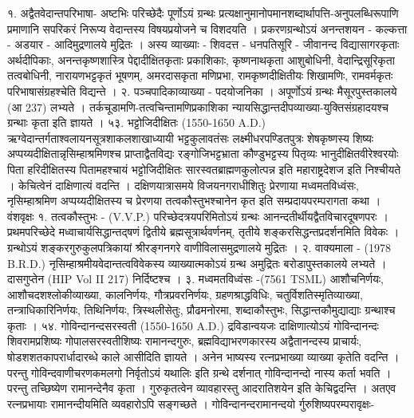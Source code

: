 १. अद्वैतवेदान्तपरिभाषा-
अष्टभिः परिच्छेदैः पूर्णोऽयं ग्रन्थः प्रत्यक्षानुमानोपमानशब्दार्थापत्ति-अनुपलब्धिरूपाणि प्रमाणानि सपरिकरं निरूप्य वेदान्तस्य विषयप्रयोजने च विशदयति । प्रकरणग्रन्थोऽयं अनन्तशयन - कल्कत्ता - अडयार - आदिमुद्रणालये मुद्रितः । अस्य व्याख्याः - शिवदत्त - धनपतिसूरि - जीवानन्द विद्यासागरकृताः अर्थदीपिकाः, अनन्तकृष्णशास्त्रि पेद्दादीक्षितकृताः प्रकाशिकाः, कृष्णनाथकृता आशुबोधिनी, वेदान्द्रिसूरिकृता तत्वबोधिनी, नारायणभट्टकृतं भूषणम्, अमरदासकृता मणिप्रभा, रामकृष्णदीक्षितीयः शिखामणिः, रामवर्मकृतः परिभाषासंग्रहश्चेति विद्यन्ते ।
२. पञ्चपादिकाव्याख्या - पदयोजनिका । अपूर्णोऽयं ग्रन्थः मैसूरपुस्तकालये (आ 237) लभ्यते ।
तर्कचूडामणि-तत्वचिन्तामणिप्रकाशिका न्यायसिद्धान्तदीपव्याख्या-युक्तिसंग्रहादयश्च ग्रन्थाः कृता इति ज्ञायते ।
५३. भट्टोजिदीक्षितः (1550-1650 A.D.)
ऋग्वेदान्तर्गताश्वलायनसूत्रशाकलशाखाध्यायी भट्टकुलावतंसः लक्ष्मीधरपण्डितपुत्रः शेषकृष्णस्य शिष्यः अप्पय्यदीक्षितान्नृसिम्हाश्रमिणश्च प्राप्ताद्वैतविद्यः रङ्गोजिभट्टभ्राता कौण्डुभट्टस्य पितृव्यः भानुदीक्षितवीरेश्वरयोः पिता हरिदीक्षितस्य पितामहश्चायं भट्टोजिदीक्षितः सारस्वतब्राह्मणकुलोत्पन्न इति महाराष्ट्रदेशज इति निश्चीयते । केचित्वेनं दाक्षिणात्यं वदन्ति । दक्षिणयात्रासमये विजयनगराधीशितुः प्रेरणाया मध्वमतविध्वंसः, नृसिम्हाश्रमिण अप्पय्यदीक्षितस्य च प्रेरणया तत्वकौस्तुभश्चानेन कृत इति सम्प्रदायपरम्परागता कथा ।
वंशवृक्षः
१. तत्वकौस्तुभः - (V.V.P.)
परिच्छेदत्रयपरिमितोऽयं ग्रन्थः आनन्दतीर्थीयद्वैतविचारदूषणपरः । प्रथमपरिच्छेदे मध्वाचार्यसिद्धान्तद्षणं द्वितीये ब्रह्मसूत्रार्थवर्णनम्, तृतीये शङ्करसिद्धन्तप्रदर्शनमिति विवेकः । ग्रन्थोऽयं शङ्करगुरुकुलपत्रिकायां श्रीरङ्गनगरे वाणीविलासमुद्रणालये मुद्रितः ।
२. वाक्यमाला - (1978 B.R.D.)
नृसिम्हाश्रमीयवेदान्तत्वविवेकस्य व्याख्यात्मकोऽयं ग्रन्थ अमुद्रितः बरोडापुस्तकालये लभ्यते । दासगुप्तेन (HIP Vol II 217) निर्दिष्टश्च ।
३. मध्वमतविध्वंसः -(7561 TSML)
आशौचनिर्णयः, आशौचदशश्लोकीव्याख्या, कालनिर्णयः, गौत्रप्रवरनिर्णयः, ग्रहणश्राद्धविधिः, चतुर्विशतिस्मृतिव्याख्या, तन्त्राधिकारिनिर्णयः, तिथिनिर्णयः, त्रिस्थलीसेतुः, प्रौढमनोरमा, शब्दाकौस्तुभः, सिद्धान्तकौमुद्याद्याः ग्रन्थाश्च कृताः ।
५४. गोविन्दानन्दसरस्वती (1550-1650 A.D.)
द्रविडान्वयजः दाक्षिणात्योऽयं गोविन्दानन्दः शिवरामप्रशिष्यः गोपालसरस्वतीशिष्यः रामानन्दगुरुः, ब्रह्मविद्याभरणकारस्य अद्वैतानन्दस्य प्राचार्यः, षोडशशतकापरार्धादारब्धे काले आसीदिति ज्ञायते । अनेन भाष्यस्य रत्नप्रभाख्या व्याख्या कृतेति वदन्ति । परन्तु गोविन्दवाणीचरणकमलगो निर्वृतोऽयं यथालिः इति ग्रन्थे दर्शनात् गोविन्दानन्दो नास्य कर्ता भवति । परन्तु तच्छिष्येण रामानन्देनैव कृता । गुरुकृतत्वेन व्यावहारस्तु आदरातिशयेन इति केचिद्वदन्ति । अतएव रत्नप्रभायाः रामानन्दीयमिति व्यवहारोऽपि सङ्गच्छते । गोविन्दानन्दरामानन्दयो र्गुरुशिष्यपरम्परावृक्षः-

